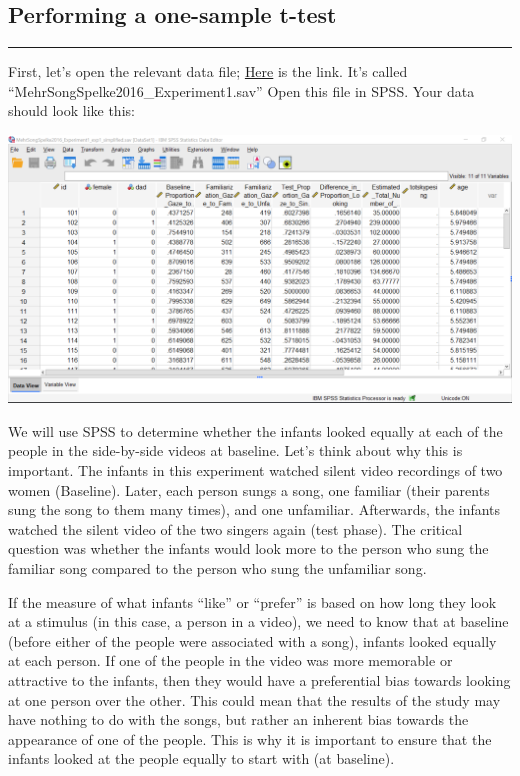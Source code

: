 \documentclass[]{book}
\begin{document}
\subsection{Performing a one-sample
t-test}\label{performing-a-one-sample-t-test}

\begin{center}\rule{0.5\linewidth}{0.5pt}\end{center}

First, let's open the relevant data file;
\href{https://github.com/CrumpLab/statisticsLab/blob/master/data/spssdata/MehrSongSpelke2016_Experiment1.sav}{Here}
is the link. It's called ``MehrSongSpelke2016\_Experiment1.sav'' Open
this file in SPSS. Your data should look like this:

\includegraphics{img/6.4.11.png}

We will use SPSS to determine whether the infants looked equally at each
of the people in the side-by-side videos at baseline. Let's think about
why this is important. The infants in this experiment watched silent
video recordings of two women (Baseline). Later, each person sungs a
song, one familiar (their parents sung the song to them many times), and
one unfamiliar. Afterwards, the infants watched the silent video of the
two singers again (test phase). The critical question was whether the
infants would look more to the person who sung the familiar song
compared to the person who sung the unfamiliar song.

If the measure of what infants ``like'' or ``prefer'' is based on how
long they look at a stimulus (in this case, a person in a video), we
need to know that at baseline (before either of the people were
associated with a song), infants looked equally at each person. If one
of the people in the video was more memorable or attractive to the
infants, then they would have a preferential bias towards looking at one
person over the other. This could mean that the results of the study may
have nothing to do with the songs, but rather an inherent bias towards
the appearance of one of the people. This is why it is important to
ensure that the infants looked at the people equally to start with (at
baseline).
\end{document}
